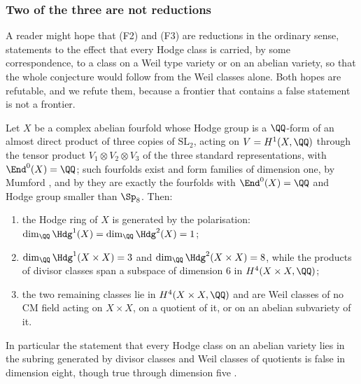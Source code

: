 \subsubsection*{Two of the three are not reductions}

A reader might hope that (F2) and (F3) are reductions in the ordinary sense,
statements to the effect that every Hodge class is carried, by some
correspondence, to a class on a Weil type variety or on an abelian variety,
so that the whole conjecture would follow from the Weil classes alone. Both
hopes are refutable, and we refute them, because a frontier that contains a
false statement is not a frontier.

\begin{proposition}\label{prop:mumfordproduct}
Let $X$ be a complex abelian fourfold whose Hodge group is a $\QQ$-form of an
almost direct product of three copies of $\mathrm{SL}_{2}$, acting on
$V=H^{1}(X,\QQ)$ through the tensor product $V_{1}\otimes V_{2}\otimes V_{3}$
of the three standard representations, with $\End^{0}(X)=\QQ$; such
fourfolds exist and form families of dimension one, by Mumford
\cite{Mum69}, and by \cite[2.5(i)]{MZ99} they are exactly the fourfolds
with $\End^{0}(X)=\QQ$ and Hodge group smaller than $\Sp_{8}$. Then:
\begin{enumerate}[label=\textup{(\roman*)},nosep,leftmargin=2.6em]
\item the Hodge ring of $X$ is generated by the polarisation:
  $\dim_{\QQ}\Hdg^{1}(X)=\dim_{\QQ}\Hdg^{2}(X)=1$;
\item $\dim_{\QQ}\Hdg^{1}(X\times X)=3$ and $\dim_{\QQ}\Hdg^{2}(X\times X)=8$,
  while the products of divisor classes span a subspace of dimension $6$
  in $H^{4}(X\times X,\QQ)$;
\item the two remaining classes lie in $H^{4}(X\times X,\QQ)$ and are Weil
  classes of no CM field acting on $X\times X$, on a quotient of it, or on an
  abelian subvariety of it.
\end{enumerate}
In particular the statement that every Hodge class on an abelian variety
lies in the subring generated by divisor classes and Weil classes of
quotients is false in dimension eight, though true through dimension five
\cite{MZ99}.
\end{proposition}

